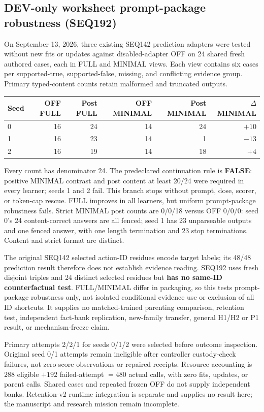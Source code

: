 \documentclass{article}
\begin{document}
\subsection{DEV-only worksheet prompt-package robustness (SEQ192)}

On September 13, 2026, three existing SEQ142 prediction adapters were tested
without new fits or updates against disabled-adapter OFF on 24 shared fresh
authored cases, each in FULL and MINIMAL views. Each view contains six cases
per supported-true, supported-false, missing, and conflicting evidence group.
Primary typed-content counts retain malformed and truncated outputs.

\begin{center}
\begin{tabular}{lrrrrr}
\toprule
Seed & OFF FULL & Post FULL & OFF MINIMAL & Post MINIMAL & $\Delta$ MINIMAL \\
\midrule
0 & 16 & 24 & 14 & 24 & $+10$ \\
1 & 16 & 23 & 14 & 1 & $-13$ \\
2 & 16 & 19 & 14 & 18 & $+4$ \\
\bottomrule
\end{tabular}
\end{center}
Every count has denominator 24. The predeclared continuation rule is
\textbf{FALSE}: positive MINIMAL contrast and post content at least 20/24
were required in every learner; seeds 1 and 2 fail. This branch stops without
prompt, dose, scorer, or token-cap rescue. FULL improves in all learners, but
uniform prompt-package robustness fails. Strict MINIMAL post counts are
0/0/18 versus OFF 0/0/0: seed 0's 24 content-correct answers are all fenced;
seed 1 has 23 unparseable outputs and one fenced answer, with one length
termination and 23 stop terminations. Content and strict format are distinct.

The original SEQ142 selected action-ID residues encode target labels; its
48/48 prediction result therefore does not establish evidence reading.
SEQ192 uses fresh disjoint triples and 24 distinct selected residues but
\textbf{has no same-ID counterfactual test}. FULL/MINIMAL differ in packaging,
so this tests prompt-package robustness only, not isolated conditional
evidence use or exclusion of all ID shortcuts. It supplies no matched-trained
parenting comparison, retention test, independent fact-bank replication,
new-family transfer, general H1/H2 or P1 result, or mechanism-freeze claim.

Primary attempts 2/2/1 for seeds 0/1/2 were selected before outcome inspection.
Original seed 0/1 attempts remain ineligible after controller custody-check
failures, not zero-score observations or repaired receipts. Resource accounting
is $288$ eligible $+192$ failed-attempt $=480$ actual calls, with zero fits,
updates, or parent calls. Shared cases and repeated frozen OFF do not supply
independent banks. Retention-v2 runtime integration is separate and supplies
no result here; the manuscript and research mission remain incomplete.
\end{document}
